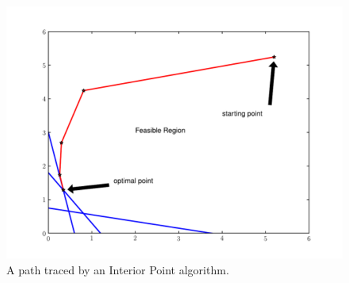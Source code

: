 \begin{figure}
\centering
\includegraphics[width=\textwidth]{interiorPath.pdf}
\caption{A path traced by an Interior Point algorithm.}
\label{fig:intPath}
\end{figure}

